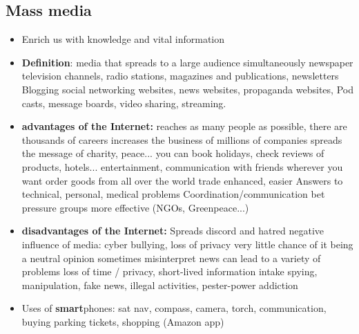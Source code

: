 \documentclass[a5paper,12pt,twoside,titlepage]{scrartcl}
\begin{document}
\subsection{Mass media}
\begin{itemize}
	\item Enrich us with knowledge and vital information
	\item \textbf{Definition}: media that spreads to a large audience simultaneously
	\subitem newspaper television channels, radio stations, magazines and publications, newsletters
	\subitem Blogging social networking websites, news websites, propaganda websites, Pod casts, message boards, video sharing, streaming.
	\item \textbf{advantages of the Internet: }
	\subitem reaches as many people as possible, there are thousands of careers
	\subitem increases the business of millions of companies
	\subitem spreads the message of charity, peace...
	\subitem you can book holidays, check reviews of products, hotels...
	\subitem entertainment, communication with friends wherever you want
	\subitem order goods from all over the world
	\subitem trade enhanced, easier
	\subitem Answers to technical, personal, medical problems
	\subitem Coordination/communication bet pressure groups \textrightarrow more effective (NGOs, Greenpeace...)
	\item \textbf{disadvantages of the Internet:}
	\subitem Spreads discord and hatred
	\subitem negative influence of media: cyber bullying, loss of privacy
	\subitem very little chance of it being a neutral opinion
	\subitem sometimes misinterpret news \textrightarrow can lead to a variety of problems
	\subitem loss of time / privacy, short-lived information intake
	\subitem spying, manipulation, fake news,  illegal activities, pester-power
	\subitem addiction
	\item Uses of \textbf{smart}phones:
	\subitem sat nav, compass, 
	\subitem camera, torch, 
	\subitem communication, 
	\subitem buying parking tickets, shopping (Amazon app)
	
\end{itemize}
\end{document}
